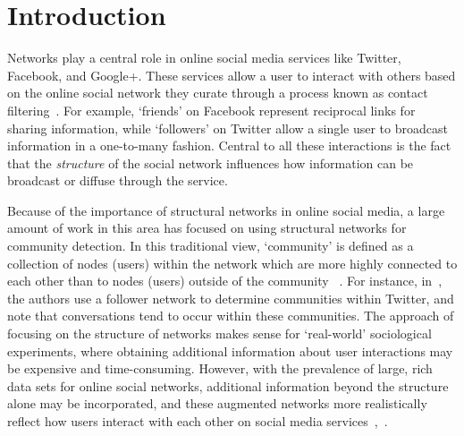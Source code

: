 \section{Introduction}

Networks play a central role in online social media services like Twitter, Facebook, and Google+. These services allow a user to interact with others based on the online social network they curate through a process known as contact filtering~\cite{cazabet2012automated}. For example, `friends' on Facebook represent reciprocal links for sharing information, while `followers' on Twitter allow a single user to broadcast information in a one-to-many fashion. Central to all these interactions is the fact that the \emph{structure} of the social network influences how information can be broadcast or diffuse through the service.

Because of the importance of structural networks in online social media, a large amount of work in this area has focused on using structural networks for community detection. In this traditional view, `community' is defined as a collection of nodes (users) within the network which are more highly connected to each other than to nodes (users) outside of the community 
~\cite{girvan2002a, newman2004finding}. For instance, in~\cite{java2009we}, the authors use a follower network to determine communities within Twitter, and note that conversations tend to occur within these communities. The approach of focusing on the structure of networks makes sense for `real-world' sociological experiments, where obtaining additional information about user interactions may be expensive and time-consuming. However, with the prevalence of large, rich data sets for online social networks, additional information beyond the structure alone may be incorporated, and these augmented networks more realistically reflect how users interact with each other on social media services~\cite{nguyen2011adaptive},~\cite{grabowicz2012social}.

